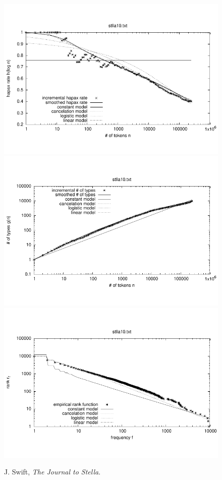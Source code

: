 \documentclass[a4paper,12pt]{article}
\begin{document}

\begin{figure}[p]
  \centering
  \vspace{-2em}
  \includegraphics[width=0.8\columnwidth]{output/herdan/stlla10_27/token_ratio.pdf}
  \\[-3em]
  \includegraphics[width=0.8\columnwidth]{output/herdan/stlla10_27/token_type.pdf}
  \\[-3em]
  \includegraphics[width=0.8\columnwidth]{output/herdan/stlla10_27/frequency_rank.pdf}
  \vspace{-2em}
  \caption{J. Swift, \emph{The Journal to Stella}.\label{figstlla10F}}
\end{figure}
\end{document}
